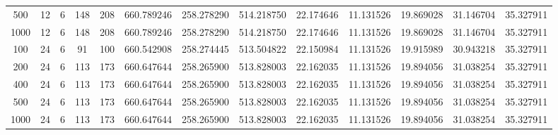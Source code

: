 \begin{table}[h]
\begin{tabular}{ccccccccccccc}
500 & 12 & 6 & 148 & 208 & 660.789246 & 258.278290 & 514.218750 & 22.174646 & 11.131526 & 19.869028 & 31.146704 & 35.327911 \\
1000 & 12 & 6 & 148 & 208 & 660.789246 & 258.278290 & 514.218750 & 22.174646 & 11.131526 & 19.869028 & 31.146704 & 35.327911 \\
100 & 24 & 6 & 91 & 100 & 660.542908 & 258.274445 & 513.504822 & 22.150984 & 11.131526 & 19.915989 & 30.943218 & 35.327911 \\
200 & 24 & 6 & 113 & 173 & 660.647644 & 258.265900 & 513.828003 & 22.162035 & 11.131526 & 19.894056 & 31.038254 & 35.327911 \\
400 & 24 & 6 & 113 & 173 & 660.647644 & 258.265900 & 513.828003 & 22.162035 & 11.131526 & 19.894056 & 31.038254 & 35.327911 \\
500 & 24 & 6 & 113 & 173 & 660.647644 & 258.265900 & 513.828003 & 22.162035 & 11.131526 & 19.894056 & 31.038254 & 35.327911 \\
1000 & 24 & 6 & 113 & 173 & 660.647644 & 258.265900 & 513.828003 & 22.162035 & 11.131526 & 19.894056 & 31.038254 & 35.327911 \\
\bottomrule
\end{tabular}
\end{table}
